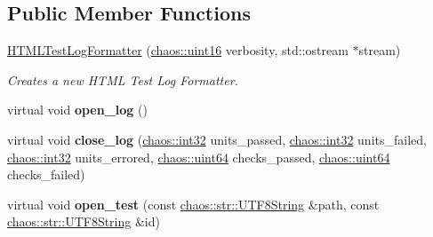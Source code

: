 \subsection*{Public Member Functions}
\begin{DoxyCompactItemize}
\item 
\hypertarget{classchaos_1_1test_1_1log__formatter_1_1_h_t_m_l_test_log_formatter_aa48a171c811fb1ec3915f0898a8404fa}{}\hyperlink{classchaos_1_1test_1_1log__formatter_1_1_h_t_m_l_test_log_formatter_aa48a171c811fb1ec3915f0898a8404fa}{H\+T\+M\+L\+Test\+Log\+Formatter} (\hyperlink{namespacechaos_ac3888b1c9e56da7fbbdb3ab8425b4068}{chaos\+::uint16} verbosity, std\+::ostream $\ast$stream)\label{classchaos_1_1test_1_1log__formatter_1_1_h_t_m_l_test_log_formatter_aa48a171c811fb1ec3915f0898a8404fa}

\begin{DoxyCompactList}\small\item\em Creates a new H\+T\+M\+L Test Log Formatter. \end{DoxyCompactList}\item 
\hypertarget{classchaos_1_1test_1_1log__formatter_1_1_h_t_m_l_test_log_formatter_a60da960b069095f4df29d02ede1f4b78}{}virtual void {\bfseries open\+\_\+log} ()\label{classchaos_1_1test_1_1log__formatter_1_1_h_t_m_l_test_log_formatter_a60da960b069095f4df29d02ede1f4b78}

\item 
\hypertarget{classchaos_1_1test_1_1log__formatter_1_1_h_t_m_l_test_log_formatter_a505b3f7d6bbcbca396830c4df9a4afe6}{}virtual void {\bfseries close\+\_\+log} (\hyperlink{namespacechaos_ad1de7efb430365afd2c9446a0f522a90}{chaos\+::int32} units\+\_\+passed, \hyperlink{namespacechaos_ad1de7efb430365afd2c9446a0f522a90}{chaos\+::int32} units\+\_\+failed, \hyperlink{namespacechaos_ad1de7efb430365afd2c9446a0f522a90}{chaos\+::int32} units\+\_\+errored, \hyperlink{namespacechaos_a34fe5f5bfc3ef6d80b5d094ed91b4d6e}{chaos\+::uint64} checks\+\_\+passed, \hyperlink{namespacechaos_a34fe5f5bfc3ef6d80b5d094ed91b4d6e}{chaos\+::uint64} checks\+\_\+failed)\label{classchaos_1_1test_1_1log__formatter_1_1_h_t_m_l_test_log_formatter_a505b3f7d6bbcbca396830c4df9a4afe6}

\item 
\hypertarget{classchaos_1_1test_1_1log__formatter_1_1_h_t_m_l_test_log_formatter_a8b8e1cefd176eca4680b407eea5f42cc}{}virtual void {\bfseries open\+\_\+test} (const \hyperlink{classchaos_1_1str_1_1_u_t_f8_string}{chaos\+::str\+::\+U\+T\+F8\+String} \&path, const \hyperlink{classchaos_1_1str_1_1_u_t_f8_string}{chaos\+::str\+::\+U\+T\+F8\+String} \&id)\label{classchaos_1_1test_1_1log__formatter_1_1_h_t_m_l_test_log_formatter_a8b8e1cefd176eca4680b407eea5f42cc}


\end{DoxyCompactItemize}

